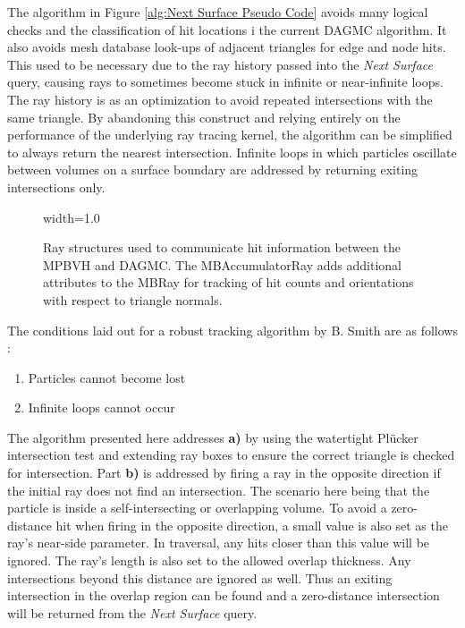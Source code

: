The algorithm in Figure \ref{alg:Next Surface Pseudo Code} avoids many logical
checks and the classification of hit locations i the current DAGMC algorithm. It
also avoids mesh database look-ups of adjacent triangles for edge and node
hits. This used to be necessary due to the ray history passed into the
\textit{Next Surface} query, causing rays to sometimes become stuck in infinite
or near-infinite loops. The ray history is as an optimization to avoid repeated
intersections with the same triangle. By abandoning this construct and relying
entirely on the performance of the underlying ray tracing kernel, the algorithm
can be simplified to always return the nearest intersection. Infinite loops in
which particles oscillate between volumes on a surface boundary are addressed by
returning exiting intersections only.

\begin{figure}[H]
  \centering
  {width=1.0\textwidth}
  \caption[Extended ray structures for particle tracking.]{Ray structures used to communicate hit information between the MPBVH
    and DAGMC. The MBAccumulatorRay adds additional attributes to the MBRay for
    tracking of hit counts and orientations with respect to triangle normals.}
  \label{fig:mpbvh_ray_structures}  
\end{figure}

The conditions laid out for a robust tracking
algorithm by B. Smith are as follows \cite{Smith_2011}:

\begin{enumerate}[{a)}]
  \bfseries
  \item \normalfont Particles cannot become lost
  \bfseries
\item \normalfont Infinite loops cannot occur
  \normalfont
\end{enumerate}

The algorithm presented here addresses \textbf{a)} by using the watertight
Pl\"{u}cker intersection test and extending ray boxes to ensure the correct
triangle is checked for intersection. Part \textbf{b)} is addressed by firing a
ray in the opposite direction if the initial ray does not find an
intersection. The scenario here being that the particle is inside a
self-intersecting or overlapping volume. To avoid a zero-distance hit when
firing in the opposite direction, a small value is also set as the ray's
near-side parameter. In traversal, any hits closer than this value will be
ignored. The ray's length is also set to the allowed overlap thickness. Any
intersections beyond this distance are ignored as well. Thus an exiting
intersection in the overlap region can be found and a zero-distance intersection
will be returned from the \textit{Next Surface} query.

